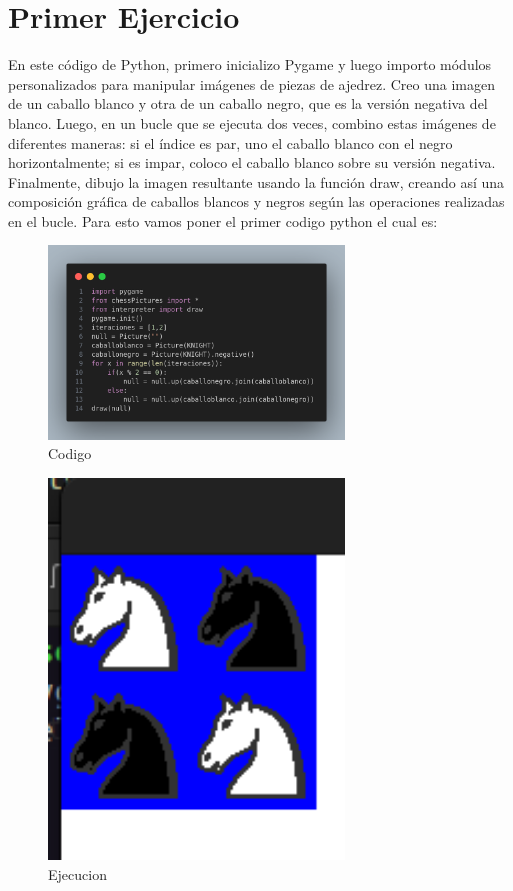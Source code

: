 \documentclass[10pt, a4paper]{article}
\begin{document}
\section{Primer Ejercicio}
En este código de Python, primero inicializo Pygame y luego importo módulos personalizados para manipular imágenes de piezas de ajedrez. Creo una imagen de un caballo blanco y otra de un caballo negro, que es la versión negativa del blanco. Luego, en un bucle que se ejecuta dos veces, combino estas imágenes de diferentes maneras: si el índice es par, uno el caballo blanco con el negro horizontalmente; si es impar, coloco el caballo blanco sobre su versión negativa. Finalmente, dibujo la imagen resultante usando la función draw, creando así una composición gráfica de caballos blancos y negros según las operaciones realizadas en el bucle.
\singlespacing
Para esto vamos poner el primer codigo python el cual es: 
\begin{figure}[H]
  \centering
  \includegraphics[width=0.7\textwidth]{img/Ej1.png}
  \caption{Codigo}
\end{figure}

\begin{figure}[H]
  \centering
  \includegraphics[width=0.7\textwidth]{img/Ejercicio1.png}
  \caption{Ejecucion}
\end{figure}
\end{document}
